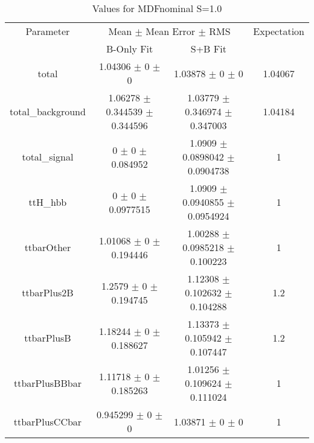 \begin{table}
\centering
\caption{Values for MDFnominal S=1.0}
\begin{tabular}{cccc}
\toprule
Parameter & \multicolumn{2}{c}{Mean $\pm$ Mean Error $\pm$ RMS} & Expectation\\
 & B-Only Fit & S+B Fit & \\
\midrule
total & \num{1.04306} $\pm$ \num{0} $\pm$ \num{0} & \num{1.03878} $\pm$ \num{0} $\pm$ \num{0} & \num{1.04067}\\
total\_background & \num{1.06278} $\pm$ \num{0.344539} $\pm$ \num{0.344596} & \num{1.03779} $\pm$ \num{0.346974} $\pm$ \num{0.347003} & \num{1.04184}\\
total\_signal & \num{0} $\pm$ \num{0} $\pm$ \num{0.084952} & \num{1.0909} $\pm$ \num{0.0898042} $\pm$ \num{0.0904738} & \num{1}\\
ttH\_hbb & \num{0} $\pm$ \num{0} $\pm$ \num{0.0977515} & \num{1.0909} $\pm$ \num{0.0940855} $\pm$ \num{0.0954924} & \num{1}\\
ttbarOther & \num{1.01068} $\pm$ \num{0} $\pm$ \num{0.194446} & \num{1.00288} $\pm$ \num{0.0985218} $\pm$ \num{0.100223} & \num{1}\\
ttbarPlus2B & \num{1.2579} $\pm$ \num{0} $\pm$ \num{0.194745} & \num{1.12308} $\pm$ \num{0.102632} $\pm$ \num{0.104288} & \num{1.2}\\
ttbarPlusB & \num{1.18244} $\pm$ \num{0} $\pm$ \num{0.188627} & \num{1.13373} $\pm$ \num{0.105942} $\pm$ \num{0.107447} & \num{1.2}\\
ttbarPlusBBbar & \num{1.11718} $\pm$ \num{0} $\pm$ \num{0.185263} & \num{1.01256} $\pm$ \num{0.109624} $\pm$ \num{0.111024} & \num{1}\\
ttbarPlusCCbar & \num{0.945299} $\pm$ \num{0} $\pm$ \num{0} & \num{1.03871} $\pm$ \num{0} $\pm$ \num{0} & \num{1}\\
\bottomrule
\end{tabular}
\end{table}